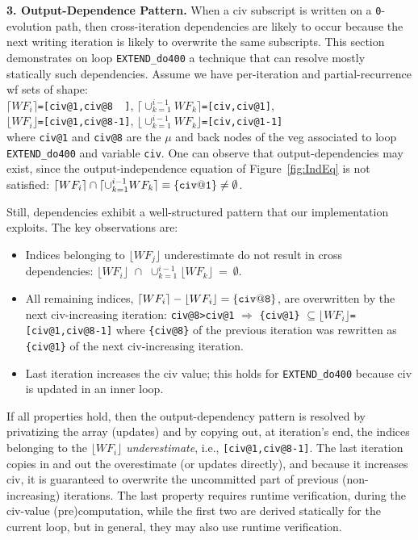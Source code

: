\documentclass[10pt,nocopyrightspace]{sigplanconf}
\begin{document}
{\bf 3. Output-Dependence Pattern.} 
%
When a {\sc civ} subscript is written on a {\tt 0}-evolution path,
then cross-iteration dependencies are likely to occur because 
the next writing iteration is likely to overwrite the same subscripts.
This section demonstrates on loop {\tt EXTEND\_do400}
a technique that can resolve mostly statically such dependencies.
%
Assume we have per-iteration and partial-recurrence {\sc wf} 
sets of shape:\vspace{1ex}\\
\noindent$\lceil WF_i\rceil${\tt=[civ@1,civ@8~~]},
$\lceil\cup_{k=1}^{i-1}WF_{k} \rceil${\tt=[civ,civ@1]},\\
\noindent$\lfloor WF_i\rfloor${\tt=[civ@1,civ@8-1]},
$\lfloor\cup_{k=1}^{i-1}WF_k \rfloor${\tt=[civ,civ@1-1]}\vspace{1ex}\\
where {\tt civ@1} and {\tt civ@8} are the $\mu$ and back nodes of
the {\sc veg} associated to loop {\tt EXTEND\_do400} and variable {\tt civ}.
%
One can observe that output-dependencies may exist, since
the output-independence equation of Figure~\ref{fig:IndEq} is not satisfied:
$\lceil WF_{i}\rceil \cap \lceil \cup_{k=1}^{i-1}WF_{k} \rceil \equiv {\tt\{civ@1\}}\ne\emptyset$.

Still, dependencies exhibit a well-structured pattern that our 
implementation exploits. The key observations are: 
\begin{itemize}
    \item Indices belonging to $\lfloor{}WF_{j}\rfloor$ underestimate  
            do not result in cross dependencies:
        $\lfloor WF_{i}\rfloor\mbox{~}\cap\mbox{~}\cup_{k=1}^{i-1}\lfloor WF_{k}\rfloor~=~\emptyset$.

    \item All remaining indices, 
        $\lceil WF_{i}\rceil - \lfloor WF_{i}\rfloor = {\tt\{civ@8\}}$,
        are overwritten by the next {\sc civ}-increasing iteration:
        {\tt{}civ@8>civ@1} $\Rightarrow$
        {\tt\{civ@1\}} $\subseteq\lfloor WF_{i}\rfloor${\tt=[civ@1,civ@8-1]}
        where {\tt\{civ@8\}} of the previous iteration was rewritten as 
        {\tt\{civ@1\}} of the next {\sc civ}-increasing iteration.

    \item Last iteration increases the {\sc civ} value; this 
        holds for {\tt EXTEND\_do400} because {\sc civ} is 
        updated in an inner loop.
\end{itemize}

If all properties hold, then the output-dependency pattern is resolved 
by privatizing the array (updates) and by copying out, at 
iteration's end, the indices belonging to the $\lfloor WF_i\rfloor$ 
{\em underestimate}, i.e., {\tt[civ@1,civ@8-1]}.
The last iteration copies in and out the overestimate (or updates directly),
and because it increases {\sc civ}, it is guaranteed to overwrite the 
uncommitted part of previous (non-increasing) iterations.
%
The last property requires runtime verification, during the {\sc civ}-value
(pre)computation, while the first two are derived statically for the current 
loop, but in general, they may also use runtime verification.
\end{document}
